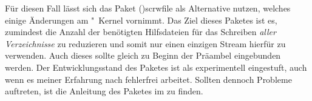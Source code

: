 Für diesen Fall lässt sich das Paket \Package(){scrwfile} 
als Alternative nutzen, welches einige Änderungen am "~Kernel 
vornimmt. Das Ziel dieses Paketes ist es, zumindest die Anzahl der benötigten 
Hilfsdateien für das Schreiben \emph{aller Verzeichnisse} zu reduzieren und 
somit nur einen einzigen Stream hierfür zu verwenden. Auch dieses sollte gleich 
zu Beginn der Präambel eingebunden werden. Der Entwicklungsstand des Paketes 
ist als experimentell eingestuft, auch wenn es meiner Erfahrung nach fehlerfrei 
arbeitet. Sollten dennoch Probleme auftreten, ist die Anleitung des Paketes im 
\scrguide zu finden. 
